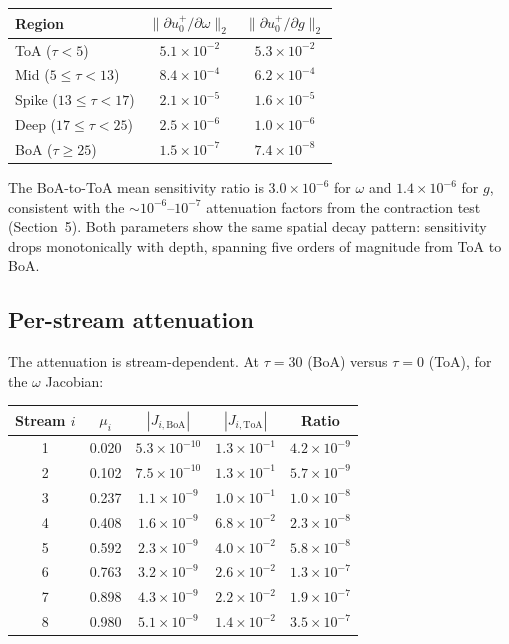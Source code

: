\documentclass[11pt]{article}
\newcommand{\norm}[1]{\lVert #1 \rVert}
\begin{document}
\begin{center}
\begin{tabular}{l c c}
\toprule
Region & $\norm{\partial u^+_0/\partial\omega}_2$
       & $\norm{\partial u^+_0/\partial g}_2$\\
\midrule
ToA ($\tau<5$)       & $5.1\times10^{-2}$ & $5.3\times10^{-2}$\\
Mid ($5\!\leq\!\tau\!<\!13$) & $8.4\times10^{-4}$ & $6.2\times10^{-4}$\\
Spike ($13\!\leq\!\tau\!<\!17$) & $2.1\times10^{-5}$ & $1.6\times10^{-5}$\\
Deep ($17\!\leq\!\tau\!<\!25$) & $2.5\times10^{-6}$ & $1.0\times10^{-6}$\\
BoA ($\tau\geq 25$)  & $1.5\times10^{-7}$ & $7.4\times10^{-8}$\\
\bottomrule
\end{tabular}
\end{center}

The BoA-to-ToA mean sensitivity ratio is
$3.0\times10^{-6}$ for $\omega$ and $1.4\times10^{-6}$
for $g$, consistent with the ${\sim}10^{-6}$--$10^{-7}$
attenuation factors from the contraction test (Section~5).
Both parameters show the same spatial decay pattern:
sensitivity drops monotonically with depth, spanning five
orders of magnitude from ToA to BoA.

\subsection{Per-stream attenuation}

The attenuation is stream-dependent.  At $\tau=30$ (BoA)
versus $\tau=0$ (ToA), for the $\omega$ Jacobian:

\begin{center}
\begin{tabular}{c c c c c}
\toprule
Stream $i$ & $\mu_i$ & $|J_{i,\mathrm{BoA}}|$
  & $|J_{i,\mathrm{ToA}}|$ & Ratio\\
\midrule
1 & 0.020 & $5.3\times10^{-10}$ & $1.3\times10^{-1}$ & $4.2\times10^{-9}$\\
2 & 0.102 & $7.5\times10^{-10}$ & $1.3\times10^{-1}$ & $5.7\times10^{-9}$\\
3 & 0.237 & $1.1\times10^{-9}$ & $1.0\times10^{-1}$ & $1.0\times10^{-8}$\\
4 & 0.408 & $1.6\times10^{-9}$ & $6.8\times10^{-2}$ & $2.3\times10^{-8}$\\
5 & 0.592 & $2.3\times10^{-9}$ & $4.0\times10^{-2}$ & $5.8\times10^{-8}$\\
6 & 0.763 & $3.2\times10^{-9}$ & $2.6\times10^{-2}$ & $1.3\times10^{-7}$\\
7 & 0.898 & $4.3\times10^{-9}$ & $2.2\times10^{-2}$ & $1.9\times10^{-7}$\\
8 & 0.980 & $5.1\times10^{-9}$ & $1.4\times10^{-2}$ & $3.5\times10^{-7}$\\
\bottomrule
\end{tabular}
\end{center}
\end{document}
